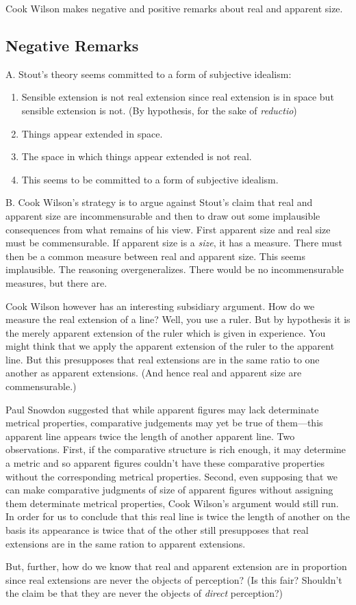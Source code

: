 \documentclass[11pt]{article}
\begin{document}
Cook Wilson makes negative and positive remarks about real and apparent size.

\subsection{Negative Remarks}\label{sub:negative_remarks} %

A. Stout's theory seems committed to a form of subjective idealism:

    \begin{enumerate}
    	\item Sensible extension is not real extension since real extension is in space but sensible extension is not. (By hypothesis, for the sake of \emph{reductio})
	    \item Things appear extended in space.
	    \item The space in which things appear extended is not real.
	    \item This seems to be committed to a form of subjective idealism.
    \end{enumerate}
    
B. Cook Wilson's strategy is to argue against Stout's claim that real and apparent size are incommensurable and then to draw out some implausible consequences from what remains of his view. First apparent size and real size must be commensurable. If apparent size is a \emph{size}, it has a measure. There must then be a common measure between real and apparent size. This seems implausible. The reasoning overgeneralizes. There would be no incommensurable measures, but there are. 

Cook Wilson however has an interesting subsidiary argument. How do we measure the real extension of a line? Well, you use a ruler. But by hypothesis it is the merely apparent extension of the ruler which is given in experience. You might think that we apply the apparent extension of the ruler to the apparent line. But this presupposes that real extensions are in the same ratio to one another as apparent extensions. (And hence real and apparent size are commensurable.) 

\begin{discussion}
    Paul Snowdon suggested that while apparent figures may lack determinate metrical properties, comparative judgements may yet be true of them---this apparent line appears twice the length of another apparent line. Two observations. First, if the comparative structure is rich enough, it may determine a metric and so apparent figures couldn't have these comparative properties without the corresponding metrical properties. Second, even supposing that we can make comparative judgments of size of apparent figures without assigning them determinate metrical properties, Cook Wilson's argument would still run. In order for us to conclude that this real line is twice the length of another on the basis its appearance is twice that of the other still presupposes that real extensions are in the same ration to apparent extensions.
\end{discussion}

But, further, how do we know that real and apparent extension are in proportion since real extensions are never the objects of perception? (Is this fair? Shouldn't the claim be that they are never the objects of \emph{direct} perception?) 
\end{document}
